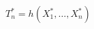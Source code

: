 \begin{equation}
    T^{\ast}_{n}
    =
    h
    \left(
    X^{\ast}_{1},
    \dots,
    X^{\ast}_{n}
    \right)
\end{equation}